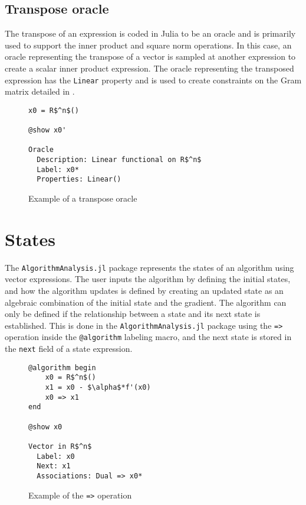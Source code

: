 \subsection*{Transpose oracle}

The transpose of an expression is coded in Julia to be an oracle and is primarily used to support the inner product and square norm operations. In this case, an oracle representing the transpose of a vector is sampled at another expression to create a scalar inner product expression. The oracle representing the transposed expression has the \texttt{Linear} property and is used to create constraints on the Gram matrix detailed in .

\begin{figure}[h!]
	\begin{lstlisting}[mathescape]
x0 = R$^n$()

@show x0'

Oracle
  Description: Linear functional on R$^n$
  Label: x0*
  Properties: Linear()
\end{lstlisting}
\caption{Example of a transpose oracle}
\label{ex_transposeoracle}
\end{figure}

\section{States} \label{states}
The \texttt{AlgorithmAnalysis.jl} package represents the states of an algorithm using vector expressions. The user inputs the algorithm by defining the initial states, and how the algorithm updates is defined by creating an updated state as an algebraic combination of the initial state and the gradient. The algorithm can only be defined if the relationship between a state and its next state is established. This is done in the \texttt{AlgorithmAnalysis.jl} package using the \texttt{=>} operation inside the \texttt{@algorithm} labeling macro, and the next state is stored in the \texttt{next} field of a state expression.

\begin{figure}[h!]
	\begin{lstlisting}[mathescape]
@algorithm begin
	x0 = R$^n$()
	x1 = x0 - $\alpha$*f'(x0)
	x0 => x1
end

@show x0

Vector in R$^n$
  Label: x0
  Next: x1
  Associations: Dual => x0*
	\end{lstlisting}
	\caption{Example of the \texttt{=>} operation}
	\label{ex_next!}
\end{figure}

